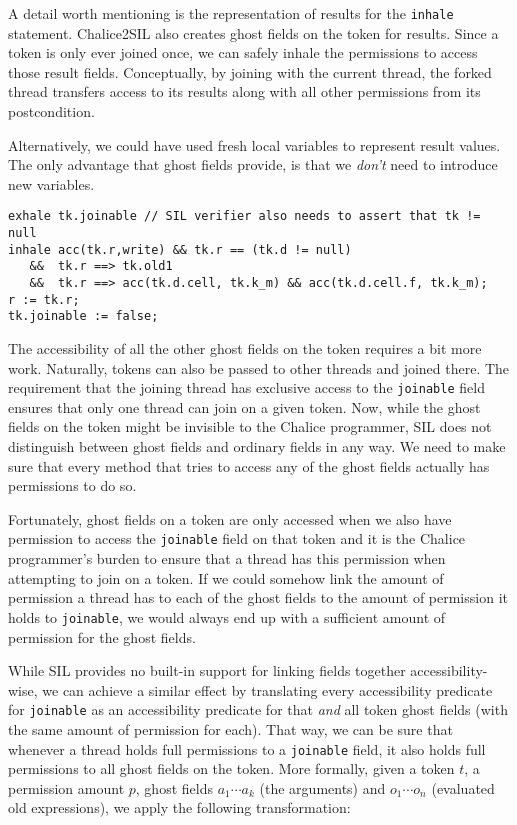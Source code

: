 A detail worth mentioning is the representation of results for the \lstinline!inhale! statement. 
Chalice2SIL also creates ghost fields on the token for results. 
Since a token is only ever joined once, we can safely inhale the permissions to access those result fields. 
Conceptually, by joining with the current thread, the forked thread transfers access to its results along with all other permissions from its postcondition.

Alternatively, we could have used fresh local variables to represent result values. The only advantage that ghost fields provide, is that we \emph{don't} need to introduce new variables.

\begin{lstlisting}[float,caption={Translation of the \lstinline!join! statement on line 24 in listing \ref{lst:fjexample}.},label=lst:fjexamplejoin,language=sil]
exhale tk.joinable // SIL verifier also needs to assert that tk != null
inhale acc(tk.r,write) && tk.r == (tk.d != null)
   &&  tk.r ==> tk.old1
   &&  tk.r ==> acc(tk.d.cell, tk.k_m) && acc(tk.d.cell.f, tk.k_m);
r := tk.r;
tk.joinable := false;
\end{lstlisting}

The accessibility of all the other ghost fields on the token requires a bit more work. 
Naturally, tokens can also be passed to other threads and joined there. 
The requirement that the joining thread has exclusive access to the \lstinline!joinable! field ensures that only one thread can join on a given token. 
Now, while the ghost fields on the token might be invisible to the Chalice programmer, SIL does not distinguish between ghost fields and ordinary fields in any way.
We need to make sure that every method that tries to access any of the ghost fields actually has permissions to do so.

Fortunately, ghost fields on a token are only accessed when we also have permission to access the \lstinline!joinable! field on that token and it is the Chalice programmer's burden to ensure that a thread has this permission when attempting to join on a token. 
If we could somehow link the amount of permission a thread has to each of the ghost fields to the amount of permission it holds to \lstinline!joinable!, we would always end up with a sufficient amount of permission for the ghost fields.

While SIL provides no built-in support for linking fields together accessibility-wise, we can achieve a similar effect by translating every accessibility predicate for \lstinline!joinable! as an accessibility predicate for that \emph{and} all token ghost fields (with the same amount of permission for each). That way, we can be sure that whenever a thread holds full permissions to a \lstinline!joinable! field, it also holds full permissions to all ghost fields on the token. More formally, given a token $t$, a permission amount $p$, ghost fields $a_1 \cdots a_k$ (the arguments) and $o_1 \cdots o_n$ (evaluated old expressions), we apply the following transformation:

